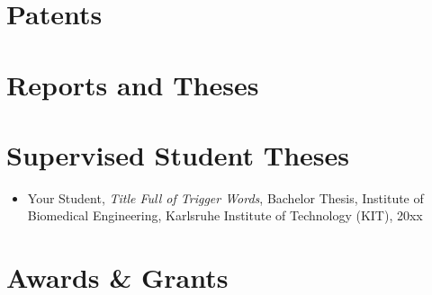 \section*{Patents}

\section*{Reports and Theses}

\section*{Supervised Student Theses}
\begin{itemize}[leftmargin=*,label={\textbullet}]
\item Your Student, \textit{Title Full of Trigger Words}, Bachelor Thesis, Institute of Biomedical Engineering, Karlsruhe Institute of Technology (KIT), 20xx
\end{itemize}


\section*{Awards \& Grants}
